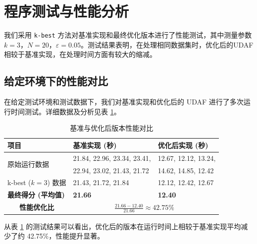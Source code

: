 \documentclass[UTF8]{ctexart}
\begin{document}
\section{程序测试与性能分析}

我们采用 \texttt{k-best} 方法对基准实现和最终优化版本进行了性能测试，其中测量参数 $k=3$，$N=20$，$\varepsilon=0.05$。测试结果表明，在处理相同数据集时，优化后的UDAF相较于基准实现，在处理时间方面有较大的缩减。

\subsection{给定环境下的性能对比}

\FloatBarrier

在给定测试环境和测试数据下，我们对基准实现和优化后的 UDAF 进行了多次运行时间测试。详细数据及分析见表 \ref{tab:perf_comparison}。

\begin{table}[ht]
    \centering
    \caption{基准与优化后版本性能对比}
    \label{tab:perf_comparison}
    \begin{tabular}{lll}
        \toprule
        \textbf{项目} & \textbf{基准实现 (秒)} & \textbf{优化后实现 (秒)} \\
        \midrule
        \multirow{2}{*}{原始运行数据} & 21.84, 22.96, 23.34, 23.41, & 12.67, 12.12, 13.24, \\
                                     & 22.94, 23.02, 21.43, 21.72  & 14.62, 14.85, 12.42 \\
        \midrule
        k-best ($k=3$) 数据 & 21.43, 21.72, 21.84 & 12.12, 12.42, 12.67 \\
        \midrule
        \textbf{最终得分 (平均值)} & \textbf{21.66} & \textbf{12.40} \\
        \midrule
        \multicolumn{1}{c}{\textbf{性能优化比}} & \multicolumn{2}{c}{$\frac{21.66 - 12.40}{21.66} \approx 42.75\%$} \\
        \bottomrule
    \end{tabular}
\end{table}

从表 \ref{tab:perf_comparison} 的测试结果可以看出，优化后的版本在运行时间上相较于基准实现平均减少了约 42.75\%，性能提升显著。

\FloatBarrier
\end{document}

